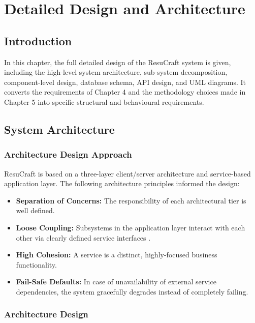 \documentclass[12pt, a4paper, oneside]{report}
\begin{document}
\chapter{Detailed Design and Architecture}

\section{Introduction}

In this chapter, the full detailed design of the ResuCraft system is given, including the high-level system architecture, sub-system decomposition, component-level design, database schema, API design, and UML diagrams. It converts the requirements of Chapter 4 and the methodology choices made in Chapter 5 into specific structural and behavioural requirements\cite{pressman2014}.

\section{System Architecture}

\subsection{Architecture Design Approach}

ResuCraft is based on a three-layer client/server architecture and service-based application layer. The following architecture principles informed the design:

\begin{itemize}
    \item \textbf{Separation of Concerns:} The responsibility of each architectural tier is well defined.
    \item \textbf{Loose Coupling:} Subsystems in the application layer interact with each other via clearly defined service interfaces \cite{fowler2018}.
    \item \textbf{High Cohesion:} A service is a distinct, highly-focused business functionality.
    \item \textbf{Fail-Safe Defaults:} In case of unavailability of external service dependencies, the system gracefully degrades instead of completely failing\cite{owasp2021}.
\end{itemize}

\subsection{Architecture Design}
\end{document}
